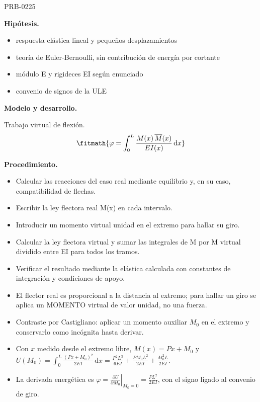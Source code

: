 \begin{studiumworked}{PRB-0225}
\begin{minipage}{\linewidth}
%
\fi
\fi
\endgroup
\par\nopagebreak
{}
\end{minipage}\par\medskip

\textbf{Hipótesis.}\begin{itemize}\item respuesta elástica lineal y pequeños desplazamientos
\item teoría de Euler-Bernoulli, sin contribución de energía por cortante
\item módulo E y rigideces EI según enunciado
\item convenio de signos de la ULE\end{itemize}

\textbf{Modelo y desarrollo.}

Trabajo virtual de flexión.\[\fitmath{\varphi = \int_{0}^{L}\frac{M(x)\,\overline{M}(x)}{E I(x)}\,\mathrm{d}x}\]

\textbf{Procedimiento.}\begin{itemize}\item Calcular las reacciones del caso real mediante equilibrio y, en su caso, compatibilidad de flechas.
\item Escribir la ley flectora real M(x) en cada intervalo.
\item Introducir un momento virtual unidad en el extremo para hallar su giro.
\item Calcular la ley flectora virtual y sumar las integrales de M por M virtual dividido entre EI para todos los tramos.
\item Verificar el resultado mediante la elástica calculada con constantes de integración y condiciones de apoyo.
\item El flector real es proporcional a la distancia al extremo; para hallar un giro se aplica un MOMENTO virtual de valor unidad, no una fuerza.
\item Contraste por Castigliano: aplicar un momento auxiliar $M_0$ en el extremo y conservarlo como incógnita hasta derivar.
\item Con $x$ medido desde el extremo libre, $M(x)=P x+M_0$ y $U(M_0)=\int_0^L \frac{(P x+M_0)^2}{2EI}\,\mathrm{d}x=\frac{P^2L^3}{6EI}+\frac{PM_0L^2}{2EI}+\frac{M_0^2L}{2EI}$.
\item La derivada energética es $\varphi=\left.\frac{\partial U}{\partial M_0}\right|_{M_0=0}=\frac{PL^2}{2EI}$, con el signo ligado al convenio de giro.\end{itemize}


\end{studiumworked}
